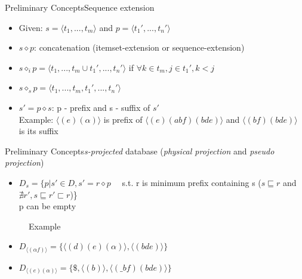 \documentclass[12pt]{beamer}
\begin{document}
\begin{frame}{Preliminary Concepts}{Sequence extension}
\begin{itemize}
\item Given: $s = \langle t_1,...,t_m \rangle$ and $p = \langle t_1',...,t_n' \rangle$
\item $s \diamond p$: concatenation (itemset-extension or sequence-extension)
\item $s \diamond_i p = \langle t_1,...,t_m \cup t_1',...,t_n' \rangle$ if $\forall k \in t_m, j \in t_1', k < j$
\item $s \diamond_s p = \langle t_1,...,t_m,t_1',...,t_n' \rangle$
\item $s' = p \diamond s$: p - prefix and s - suffix of $s'$\\ Example: $\langle (e)(\alpha) \rangle$ is prefix of $\langle (e)(abf)(bde) \rangle$ and $\langle (bf)(bde) \rangle$ is its suffix
\end{itemize}
\end{frame}

\begin{frame}{Preliminary Concepts}{{\it s-projected} database ({\it physical projection } and {\it pseudo projection})}
\begin{itemize}
\item $D_s = \{p | s' \in D, s' = r \diamond p$ ~~s.t. r is minimum prefix containing s ($s \sqsubseteq r$ and $\nexists r',s \sqsubseteq r' \sqsubset r$)\}\\ p can be empty
\end{itemize}
\begin{figure}
\caption*{Example}
\end{figure}
\begin{itemize}
\item $D_{\langle (\alpha f) \rangle} = \{ \langle (d)(e)(\alpha) \rangle, \langle (bde) \rangle \}$
\item $D_{\langle (e)(\alpha) \rangle} = \{ \$,\langle (b) \rangle,\langle (\_bf)(bde) \rangle \}$
\end{itemize}
\end{frame}
\end{document}
